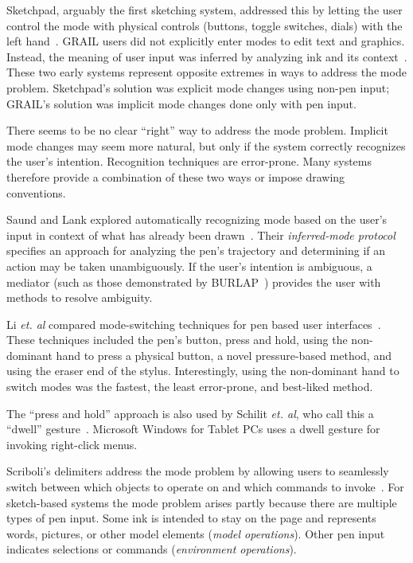 Sketchpad, arguably the first sketching system, addressed this by
letting the user control the mode with physical controls (buttons,
toggle switches, dials) with the left
hand~\cite{sutherland-sketchpad}. GRAIL users did not explicitly enter
modes to edit text and graphics. Instead, the meaning of user input
was inferred by analyzing ink and its
context~\cite{ellis-grail}. These two early systems represent opposite
extremes in ways to address the mode problem. Sketchpad's solution was
explicit mode changes using non-pen input; GRAIL's solution was
implicit mode changes done only with pen input.

There seems to be no clear ``right'' way to address the mode
problem. Implicit mode changes may seem more natural, but only if the
system correctly recognizes the user's intention. Recognition
techniques are error-prone. Many systems therefore provide a
combination of these two ways or impose drawing conventions.

Saund and Lank explored automatically recognizing mode based on the
user's input in context of what has already been
drawn~\cite{saund-inferred-mode}. Their \textit{inferred-mode
protocol} specifies an approach for analyzing the pen's trajectory and
determining if an action may be taken unambiguously. If the user's
intention is ambiguous, a mediator (such as those demonstrated by
BURLAP~\cite{mankoff-burlap}) provides the user with methods to
resolve ambiguity.

Li \textit{et. al} compared mode-switching techniques for pen based
user interfaces~\cite{li-mode-switching}. These techniques included
the pen's button, press and hold, using the non-dominant hand to press
a physical button, a novel pressure-based method, and using the eraser
end of the stylus. Interestingly, using the non-dominant hand to
switch modes was the fastest, the least error-prone, and best-liked
method. 

The ``press and hold'' approach is also used by
Schilit \textit{et. al}, who call this a ``dwell''
gesture~\cite{schilit-xlibris}.  Microsoft Windows for Tablet PCs uses
a dwell gesture for invoking right-click menus.

Scriboli's delimiters address the mode problem by allowing users to
seamlessly switch between which objects to operate on and which
commands to invoke~\cite{hinckley-scriboli}. For sketch-based systems
the mode problem arises partly because there are multiple types of pen
input. Some ink is intended to stay on the page and represents words,
pictures, or other model elements (\textit{model operations}). Other
pen input indicates selections or commands (\textit{environment
  operations}).

